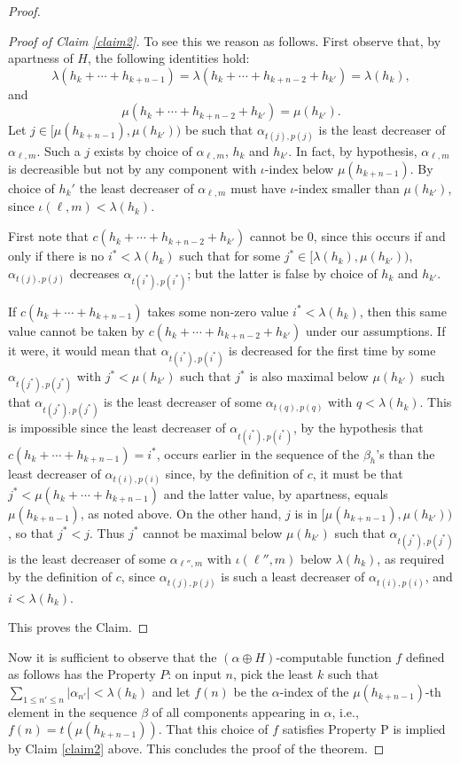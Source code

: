 \documentclass[a4paper,11pt]{article}
\begin{document}
\begin{proof}
\begin{proof}[Proof of Claim \ref{claim2}]
To see this we reason as follows. First observe that, by apartness of $H$, the following identities hold:
$$\lambda(h_k + \cdots + h_{k+n-1}) = \lambda(h_k + \cdots + h_{k+n-2} + h_{k'}) = \lambda(h_k),$$
and
$$\mu(h_k + \cdots + h_{k+n-2} + h_{k'})=\mu(h_{k'}).$$
Let $j \in [\mu(h_{k+n-1}), \mu(h_{k'}))$ be such that $\alpha_{t(j),p(j)}$ is the least decreaser of $\alpha_{\ell,m}$. Such a $j$ exists by choice of $\alpha_{\ell,m}$, $h_k$ and $h_{k'}$. In fact, by hypothesis, 
$\alpha_{\ell,m}$ is decreasible but not by any component with $\iota$-index below $\mu(h_{k+n-1})$. By choice
of $h_k'$ the least decreaser of $\alpha_{\ell,m}$ must have $\iota$-index smaller than $\mu(h_{k'})$, since $\iota(\ell,m) < \lambda(h_k)$.

First note that
$c(h_k + \cdots + h_{k+n-2} + h_{k'})$ cannot be $0$, 
since this occurs if and only if there is no $i^* < \lambda(h_k)$ such that for some $j^* \in [\lambda(h_k), \mu(h_{k'}))$, $\alpha_{t(j),p(j)}$ decreases $\alpha_{t(i^*), p(i^*)}$; but the latter is false by choice of $h_k$ and $h_{k'}$. 

If $c(h_k + \cdots + h_{k+n-1})$ takes some non-zero value $i^* < \lambda(h_k)$, then this same value cannot
be taken by $c(h_k + \cdots + h_{k+n-2} + h_{k'})$ under our assumptions. 
If it were, it would mean that $\alpha_{t(i^*),p(i^*)}$ is decreased for the 
first time by some $\alpha_{t(j^*), p(j^*)}$ with $j^* < \mu(h_{k'})$ such that $j^*$ is also maximal below $\mu(h_{k'})$ such that $\alpha_{t(j^*), p(j^*)}$ is the least decreaser of some $\alpha_{t(q),p(q)}$ with  $q < \lambda(h_k)$. This is impossible since the least decreaser of $\alpha_{t(i^*),p(i^*)}$, by the hypothesis that $c(h_k + \cdots + h_{k+n-1})=i^*$, occurs earlier in the sequence of the $\beta_h$'s than the least decreaser of $\alpha_{t(i),p(i)}$ since, by the definition of $c$, it must be that $j^* < \mu(h_k + \cdots + h_{k+n-1})$ and the latter value, by apartness, equals $\mu(h_{k+n-1})$, as noted above. On the other hand, $j$ is in $[\mu(h_{k+n-1}), \mu(h_{k'}))$, so that $j^*<j$. Thus $j^*$ cannot be maximal below $\mu(h_{k'})$ such that $\alpha_{t(j^*),p(j^*)}$ is the least decreaser of some $\alpha_{\ell'',m}$ with $\iota(\ell'',m)$ below $\lambda(h_k)$, as required by the definition of $c$, since $\alpha_{t(j),p(j)}$ is such a least decreaser of $\alpha_{t(i),p(i)}$, and $i<\lambda(h_k)$. 

This proves the Claim.
\end{proof}

Now it is sufficient to observe that the $(\alpha \oplus H)$-computable function 
$f$ defined as follows has the Property $P$: on input $n$, 
pick the least $k$ such that $\sum_{1\leq n' \leq n} |\alpha_{n'}| < \lambda(h_k)$ and 
let $f(n)$ be the $\alpha$-index of the $\mu(h_{k+n-1})$-th 
element in the sequence $\beta$ of all components appearing in $\alpha$, i.e., $f(n) = t(\mu(h_{k+n-1}))$. 
That this choice of $f$ satisfies Property P is implied by Claim \ref{claim2} above. This concludes the proof of the theorem.
\end{proof}
\end{document}
